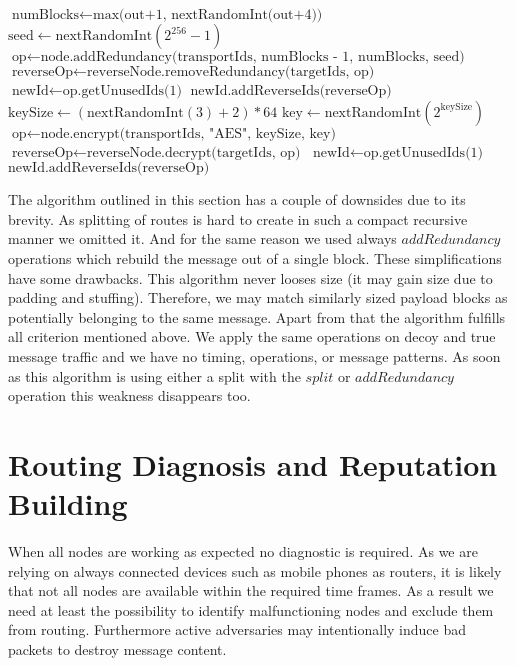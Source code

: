 \begin{breakablealgorithm}
\begin{algorithmic}[1]
				\State $\text{numBlocks} \gets \text{max(out+1, nextRandomInt(out+4))}$
				\State $\text{seed} \gets \text{nextRandomInt}(2^{256}-1)$
				\State $\text{op} \gets \text{node.addRedundancy(transportIds, numBlocks - 1, numBlocks, seed)}$
					\State $\text{reverseOp} \gets \text{reverseNode.removeRedundancy(targetIds, op)}$
					\State $\text{newId} \gets \text{op.getUnusedIds(1)}$
					\State $\text{newId.addReverseIds(reverseOp)}$
				\EndIf	
			\Else
				\State $\text{keySize}   \gets (\text{nextRandomInt}(3)+2)*64$
				\State $\text{key}       \gets \text{nextRandomInt}(2^{\text{keySize}})$
				\State $\text{op}        \gets \text{node.encrypt(transportIds, "AES", keySize, key)}$
					\State $\text{reverseOp} \gets \text{reverseNode.decrypt(targetIds, op)}$
					\State $\text{newId}     \gets \text{op.getUnusedIds(1)}$
					\State $\text{newId.addReverseIds(reverseOp)}$
				\EndIf	
			\EndIf
		\EndFunction\label{alg:endAssignOperation-line}
	\end{algorithmic}
\end{breakablealgorithm}

The algorithm outlined in this section has a couple of downsides due to its brevity. As splitting of routes is hard to create in such a compact recursive manner we omitted it. And for the same reason we used always $addRedundancy$ operations which rebuild the message out of a single block. These simplifications have some drawbacks. This algorithm never looses size (it may gain size due to padding and stuffing). Therefore, we may match similarly sized payload blocks as potentially belonging to the same message. Apart from that the algorithm fulfills all criterion mentioned above. We apply the same operations on decoy and true message traffic and we have no timing, operations, or message patterns. As soon as this algorithm is using either a split with the $split$ or $addRedundancy$ operation this weakness disappears too.

\section{Routing Diagnosis and Reputation Building\label{sec:diagnosisOfMessagePath}}
When all nodes are working as expected no diagnostic is required. As we are relying on always connected devices such as mobile phones as routers, it is likely  that not all nodes are available within the required time frames. As a result we need at least the possibility to identify malfunctioning nodes and exclude them from routing. Furthermore active adversaries may intentionally induce bad packets to destroy message content.

